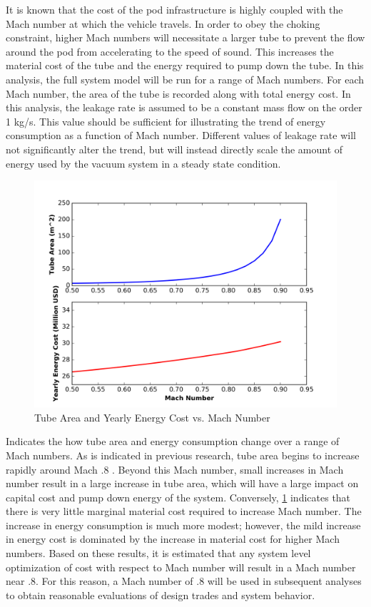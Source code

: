 It is known that the cost of the pod infrastructure is highly coupled with the
Mach number at which the vehicle travels. In order to obey the choking constraint,
higher Mach numbers will necessitate a larger tube to prevent the flow around
the pod from accelerating to the speed of sound. This increases the material
cost of the tube and the energy required to pump down the tube. In this analysis,
the full system model will be run for a range of Mach numbers.
For each Mach number, the area of the tube is recorded along with total energy cost.
In this analysis, the leakage rate is assumed to be a constant mass flow on the order 1 kg/s.
This value should be sufficient for illustrating the trend of energy
consumption as a function of Mach number. Different values of leakage rate will
not significantly alter the trend, but will instead directly scale the amount
of energy used by the vacuum system in a steady state condition.
\begin{figure}
	\centering
	\includegraphics{../../images/graphs/mach_trades/pressure_vs_mach.png}
	\caption{Tube Area and Yearly Energy Cost vs. Mach Number}
	\label{fig:tube_area_cost_vs_mach}
\end{figure}
 Indicates the how tube area and energy
consumption change over a range of Mach numbers. As is indicated in previous research,
tube area begins to increase rapidly around Mach .8 \cite{Chin}.
Beyond this Mach number, small increases in Mach number result in a large
increase in tube area, which will have a large impact on capital cost and pump
down energy of the system. Conversely, \cref{fig:tube_area_cost_vs_mach}
indicates that there is very little marginal material cost required to increase
Mach number. The increase in energy consumption is much more modest; however,
the mild increase in energy cost is dominated by the increase in material cost
for higher Mach numbers. Based on these results, it is estimated that any
system level optimization of cost with respect to Mach number will result in a
Mach number near .8. For this reason, a Mach number of .8 will be used in
subsequent analyses to obtain reasonable evaluations of design trades and system behavior.
